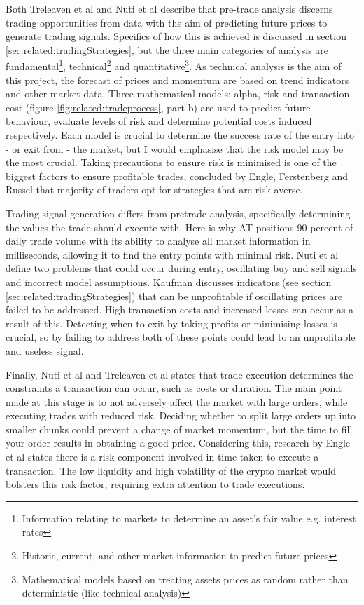 Both Treleaven et al \cite{ART:Treleaven:2013} and Nuti et al \cite{ART:Nuti:2011} describe that pre-trade analysis discerns trading opportunities from data with the aim of predicting future prices to generate trading signals. Specifics of how this is achieved is discussed in section \ref{sec:related:tradingStrategies}, but the three main categories of analysis are fundamental\footnote{Information relating to markets to determine an asset's fair value e.g. interest rates}, technical\footnote{Historic, current, and other market information to predict future prices} and quantitative\footnote{Mathematical models based on treating assets prices as random rather than deterministic (like technical analysis)}. As technical analysis is the aim of this project, the forecast of prices and momentum are based on trend indicators and other market data. Three mathematical models: alpha, risk and transaction cost (figure \ref{fig:related:tradeprocess}, part b) are used to predict future behaviour, evaluate levels of risk and determine potential costs induced respectively. Each model is crucial to determine the success rate of the entry into - or exit from - the market, but I would emphasise that the risk model may be the most crucial. Taking precautions to ensure risk is minimised is one of the biggest factors to ensure profitable trades, concluded by Engle, Ferstenberg and Russel \cite{ART:Robert:2012} that majority of traders opt for strategies that are risk averse.

Trading signal generation differs from pretrade analysis, specifically determining the values the trade should execute with. Here is why AT positions 90 percent of daily trade volume \cite{WEB:Cheng:2017,ART:Kolakowski:2018} with its ability to analyse all market information in milliseconds, allowing it to find the entry points with minimal risk. Nuti et al \cite{ART:Nuti:2011} define two problems that could occur during entry, oscillating buy and sell signals and incorrect model assumptions.  Kaufman \cite{BOOK:Kaufman:2013} discusses indicators (see section \ref{sec:related:tradingStrategies}) that can be unprofitable if oscillating prices are failed to be addressed. High transaction costs and increased losses can occur as a result of this. Detecting when to exit by taking profits or minimising losses is crucial, so by failing to address both of these points could lead to an unprofitable and useless signal. 


Finally, Nuti et al \cite{ART:Nuti:2011} and Treleaven et al \cite{ART:Treleaven:2013} states that trade execution determines the constraints a transaction can occur, such as costs or duration. The main point made at this stage is to not adversely affect the market with large orders, while executing trades with reduced risk. Deciding whether to split large orders up into smaller chunks could prevent a change of market momentum, but the time to fill your order results in obtaining a good price. Considering this, research by Engle et al \cite{ART:Robert:2012} states there is a risk component involved in time taken to execute a transaction. The low liquidity and high volatility of the crypto market would bolsters this risk factor, requiring extra attention to trade executions. 


